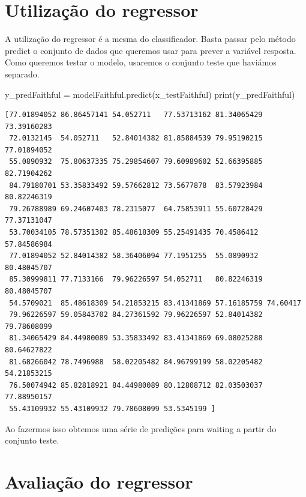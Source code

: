 \documentclass[
  letterpaper,
  DIV=11,
  numbers=noendperiod]{scrreprt}
\newenvironment{Shaded}{\begin{snugshade}}{\end{snugshade}}
\newcommand{\BuiltInTok}[1]{\textcolor[rgb]{0.00,0.23,0.31}{#1}}
\newcommand{\NormalTok}[1]{\textcolor[rgb]{0.00,0.23,0.31}{#1}}
\newcommand{\OperatorTok}[1]{\textcolor[rgb]{0.37,0.37,0.37}{#1}}
\begin{document}
\hypertarget{utilizauxe7uxe3o-do-regressor}{%
\section{Utilização do regressor}\label{utilizauxe7uxe3o-do-regressor}}

A utilização do regressor é a mesma do classificador. Basta passar pelo
método predict o conjunto de dados que queremos usar para prever a
variável resposta. Como queremos testar o modelo, usaremos o conjunto
teste que haviámos separado.

\begin{Shaded}
\begin{Highlighting}[]
\NormalTok{y\_predFaithful }\OperatorTok{=}\NormalTok{ modelFaithful.predict(x\_testFaithful)}
\BuiltInTok{print}\NormalTok{(y\_predFaithful)}
\end{Highlighting}
\end{Shaded}

\begin{verbatim}
[77.01894052 86.86457141 54.052711   77.53713162 81.34065429 73.39160283
 72.0132145  54.052711   52.84014382 81.85884539 79.95190215 77.01894052
 55.0890932  75.80637335 75.29854607 79.60989602 52.66395885 82.71904262
 84.79180701 53.35833492 59.57662812 73.5677878  83.57923984 80.82246319
 79.26788989 69.24607403 78.2315077  64.75853911 55.60728429 77.37131047
 53.70034105 78.57351382 85.48618309 55.25491435 70.4586412  57.84586984
 77.01894052 52.84014382 58.36406094 77.1951255  55.0890932  80.48045707
 85.30999811 77.7133166  79.96226597 54.052711   80.82246319 80.48045707
 54.5709021  85.48618309 54.21853215 83.41341869 57.16185759 74.60417
 79.96226597 59.05843702 84.27361592 79.96226597 52.84014382 79.78608099
 81.34065429 84.44980089 53.35833492 83.41341869 69.08025288 80.64627822
 81.68266042 78.7496988  58.02205482 84.96799199 58.02205482 54.21853215
 76.50074942 85.82818921 84.44980089 80.12808712 82.03503037 77.88950157
 55.43109932 55.43109932 79.78608099 53.5345199 ]
\end{verbatim}

Ao fazermos isso obtemos uma série de predições para waiting a partir do
conjunto teste.

\hypertarget{avaliauxe7uxe3o-do-regressor}{%
\section{Avaliação do regressor}\label{avaliauxe7uxe3o-do-regressor}}
\end{document}
